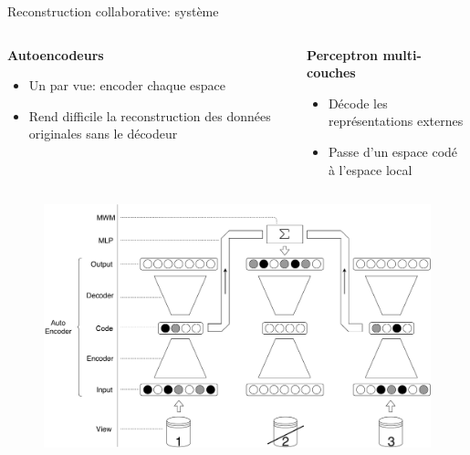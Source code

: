 \documentclass[hyperref={pdfpagelabels=false}]{beamer}
\begin{document}
    \begin{frame}{Reconstruction collaborative: système}
        \begin{columns}
            \fontsize{10pt}{12pt}
            \begin{column}{0.5\textwidth}
                \textbf{Autoencodeurs}
                \begin{itemize}
                    \item Un par vue: encoder chaque espace
                    \item Rend difficile la reconstruction des données 
                        originales sans le décodeur
                \end{itemize}
            \end{column}
            \begin{column}{0.5\textwidth}
                \textbf{Perceptron multi-couches}
                \begin{itemize}
                    \item Décode les représentations externes
                    \item Passe d'un espace codé à l'espace local
                \end{itemize}
            \end{column}
        \end{columns}
        \vspace{-0.3cm}
        \begin{figure}[h]
            \centering
            \includegraphics[scale=.23]{base_system.pdf}
        \end{figure}
        \vspace{-0.3cm}
    \end{frame}
\end{document}
